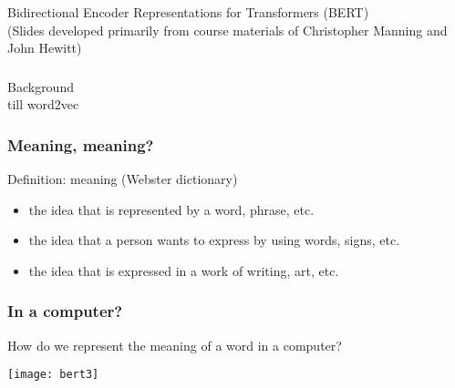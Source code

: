 \begin{frame}[fragile]\frametitle{}
\begin{center}
{\Large Bidirectional Encoder Representations for Transformers (BERT)}\\

{\tiny (Slides developed primarily from course materials of Christopher Manning and John Hewitt)}

\end{center}
\end{frame}

\begin{frame}[fragile]\frametitle{}
\begin{center}
{\Large Background}\\

{till word2vec}

\end{center}
\end{frame}

\begin{frame}[fragile]\frametitle{Meaning, meaning?}
Definition: meaning (Webster dictionary)

\begin{itemize}
\item the idea that is represented by a word, phrase, etc.
\item the idea that a person wants to express by using  words, signs, etc.
\item the idea that is expressed in a work of writing, art, etc.  
\end{itemize}




\end{frame}


\begin{frame}[fragile]\frametitle{In a computer?}

How do we represent the meaning of a word in a computer?

\begin{center}
\texttt{[image: bert3]}
\end{center}		  


\end{frame}

